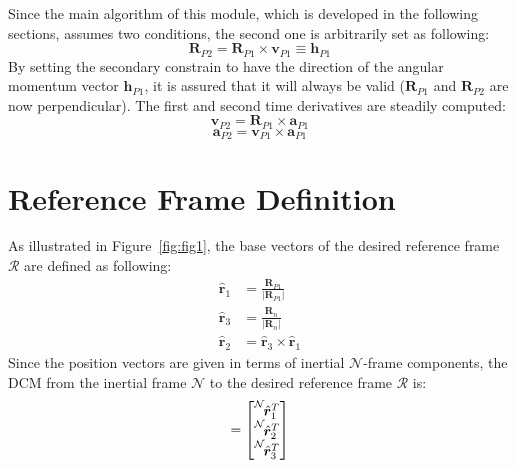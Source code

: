 Since the main algorithm of this module, which is developed in the following sections, assumes two conditions, the second one is arbitrarily set as following:
\begin{equation}
		 \bm{R}_{P2} = \bm{R}_{P1} \times \bm{v}_{P1} \equiv  \bm{h}_{P1}
\end{equation}
By setting the secondary constrain to have the direction of the angular momentum vector $ \bm{h}_{P1}$, it is assured that it will always be valid ($\bm{R}_{P1}$ and $\bm{R}_{P2}$ are now perpendicular).
The first and second time derivatives are steadily computed:
\begin{equation}
	\bm{v}_{P2} =  \bm{R}_{P1} \times \bm{a}_{P1} 
\end{equation}
\begin{equation}
	\bm{a}_{P2} =  \bm{v}_{P1} \times \bm{a}_{P1} 
\end{equation}
\section{Reference Frame Definition}
As illustrated in Figure~\ref{fig:fig1}, the base vectors of the desired reference frame $\mathcal{R}$  are defined as following:
\begin{subequations}
	\begin{align}
		\hat{\bm r}_{1} &= \frac{{\bm R}_{P1}} {|{\bm R}_{P1}|} \\
		\hat{\bm r}_{3} &= \frac{{\bm R}_{n}}{|{\bm R}_{n}|} \\
		\hat{\bm r}_{2} &=  \hat{\bm r}_{3} \times \hat{\bm r}_{1} 
	\end{align}
\end{subequations}
Since the position vectors are given in terms of inertial $\mathcal{N}$-frame components, the DCM from the inertial frame $\mathcal{N}$ to the desired reference frame $\mathcal{R}$ is:
\begin{equation}
	[RN] = \begin{bmatrix}
		\leftexp{N}{ \hat{\bm r}_{1}^{T} } \\
		\leftexp{N}{ \hat{\bm r}_{2}^{T} }  \\
		\leftexp{N}{ \hat{\bm r}_{3}^{T} }  
	\end{bmatrix}
\end{equation}
